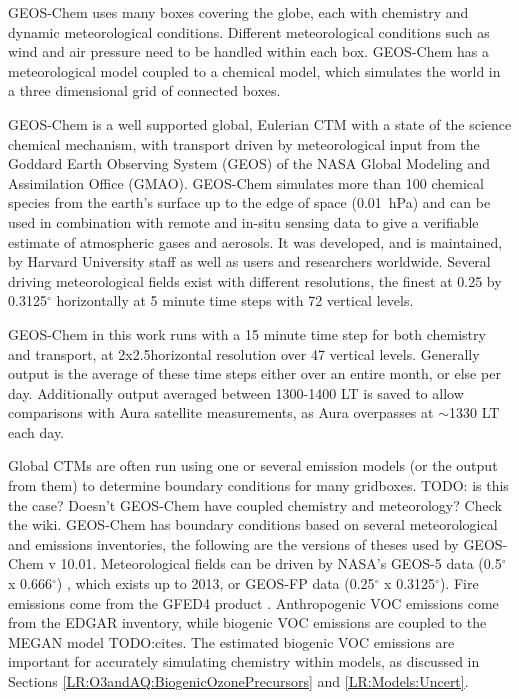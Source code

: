   GEOS-Chem uses many boxes covering the globe, each with chemistry and dynamic meteorological conditions.
  Different meteorological conditions such as wind and air pressure need to be handled within each box.      
  GEOS-Chem has a meteorological model coupled to a chemical model, which simulates the world in a three dimensional grid of connected boxes.
  
  GEOS-Chem is a well supported global, Eulerian CTM with a state of the science chemical mechanism, with transport driven by meteorological input from the Goddard Earth Observing System (GEOS) of the NASA Global Modeling and Assimilation Office (GMAO).
  GEOS-Chem simulates more than 100 chemical species from the earth's surface up to the edge of space (0.01~hPa) and can be used in combination with remote and in-situ sensing data to give a verifiable estimate of atmospheric gases and aerosols.
  It was developed, and is maintained, by Harvard University staff as well as users and researchers worldwide.
  Several driving meteorological fields exist with different resolutions, the finest at 0.25 by 0.3125$^\circ$ horizontally at 5 minute time steps with 72 vertical levels.
  
  GEOS-Chem in this work runs with a 15 minute time step for both chemistry and transport, at 2x2.5\degr horizontal resolution over 47 vertical levels.
  Generally output is the average of these time steps either over an entire month, or else per day.
  Additionally output averaged between 1300-1400 LT is saved to allow comparisons with Aura satellite measurements, as Aura overpasses at $\sim$1330 LT each day.
  
  Global CTMs are often run using one or several emission models (or the output from them) to determine boundary conditions for many gridboxes.
  TODO: is this the case? Doesn't GEOS-Chem have coupled chemistry and meteorology? Check the wiki.
  GEOS-Chem has boundary conditions based on several meteorological and emissions inventories, the following are the versions of theses used by GEOS-Chem v 10.01. 
  Meteorological fields can be driven by NASA's GEOS-5 data (0.5$^{\circ}$ x 0.666$^{\circ}$) \citep{Chen2009}, which exists up to 2013, or GEOS-FP data (0.25$^{\circ}$ x 0.3125$^{\circ}$).
  Fire emissions come from the GFED4 product \citep{Giglio2013}. 
  Anthropogenic VOC emissions come from the EDGAR inventory, while biogenic VOC emissions are coupled to the MEGAN model TODO:cites.
  The estimated biogenic VOC emissions are important for accurately simulating chemistry within models, as discussed in Sections \ref{LR:O3andAQ:BiogenicOzonePrecursors} and \ref{LR:Models:Uncert}.

